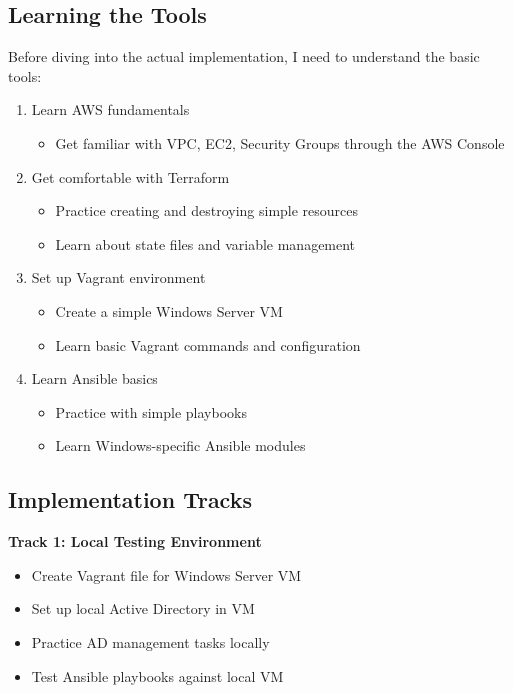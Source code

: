 \documentclass[11pt,a4paper]{article}
\begin{document}
\subsection{Learning the Tools}
Before diving into the actual implementation, I need to understand the basic tools:

\begin{enumerate}[label=\arabic*.]
    \item Learn AWS fundamentals
        \begin{itemize}
            \item Get familiar with VPC, EC2, Security Groups through the AWS Console
        \end{itemize}
    
    \item Get comfortable with Terraform
        \begin{itemize}
            \item Practice creating and destroying simple resources
            \item Learn about state files and variable management
        \end{itemize}
    
    \item Set up Vagrant environment
        \begin{itemize}
            \item Create a simple Windows Server VM
            \item Learn basic Vagrant commands and configuration
        \end{itemize}
    
    \item Learn Ansible basics
        \begin{itemize}
            \item Practice with simple playbooks
            \item Learn Windows-specific Ansible modules
        \end{itemize}
\end{enumerate}

\subsection{Implementation Tracks}

\textbf{Track 1: Local Testing Environment}
\begin{itemize}
    \item Create Vagrant file for Windows Server VM
    \item Set up local Active Directory in VM
    \item Practice AD management tasks locally
    \item Test Ansible playbooks against local VM
\end{itemize}
\end{document}
